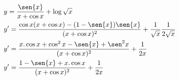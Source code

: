 \begin{ex}
\begin{align}
&y=\frac{\sen{x}} {x+\cos{x}}+\log{\sqrt{x}}\nonumber\\
&y'=\frac{\cos{x}(x+\cos{x})-(1-\sen{x})\sen{x}}{(x+\cos{x})^2}+\frac{1}{\sqrt{x}}\frac{1}{2\sqrt{x}}\nonumber\\
&y'=\frac{x.\cos{x}+\cos^2{x}-\sen{x}+\sen^2{x}}{(x+\cos{x})^2}+\frac{1}{2x}\nonumber\\
&y'=\frac{1-\sen{x}+x.\cos{x}}{(x+\cos{x})^2}+\frac{1}{2x}\nonumber
\end{align}
\end{ex}
